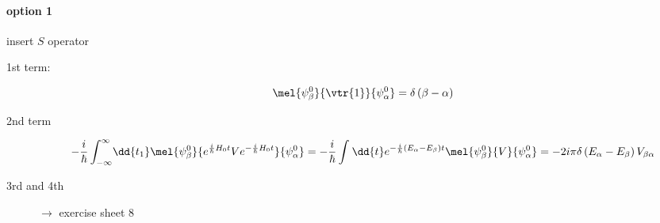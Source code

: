 \paragraph{option 1} insert $S$ operator
\begin{description}
	\item[1st term:]
		\begin{dmath}[]
			\mel{\psi_{\beta}^{0}}{\vtr{1}}{\psi_{\alpha}^{0}}=\delta\left( \beta-\alpha \right)
		\end{dmath}
	\item[2nd term] 
		\begin{dmath}[]
			-\frac{i}{\hbar}\int_{-\infty}^{\infty}\! \dd{t_1}\mel{\psi_{\beta}^{0}}{e^{\frac{i}{\hbar}H_0t}Ve^{-\frac{i}{\hbar}H_0t}}{\psi_{\alpha}^{0}}
			=-\frac{i}{\hbar}\int_{}^{}\dd{t}e^{-\frac{i}{\hbar}\left( E_{\alpha}-E_{\beta} \right)t}\mel{\psi_{\beta}^{0}}{V}{\psi_{\alpha}^{0}}
			=-2i\pi \delta\left( E_{\alpha}-E_{\beta} \right)V_{\beta\alpha}
		\end{dmath}
	\item[3rd and 4th] $\to$ exercise sheet 8
\end{description}
